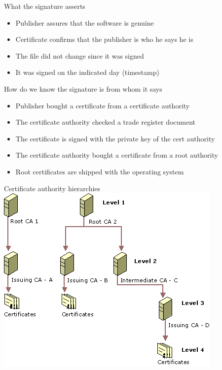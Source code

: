\documentclass[11pt]{beamer}
\begin{document}
\begin{frame}{What the signature asserts}
\begin{itemize}
\item Publisher assures that the software is genuine
\item Certificate confirms that the publisher is who he says he is
\item The file did not change since it was signed
\item It was signed on the indicated day (timestamp)
\end{itemize}
\end{frame}

\begin{frame}{How do we know the signature is from whom it says}
\begin{itemize}
\item Publisher bought a certificate from a certificate authority
\item The certificate authority checked a trade register document
\item The certificate is signed with the private key of the cert authority
\item The certificate authority bought a certificate from a root authority
\item Root certificates are shipped with the operating system
\end{itemize}
\end{frame}

\begin{frame}{Certificate authority hierarchies}
\includegraphics[scale=0.5]{certificate_authority_hierarchies.png}
\end{frame}
\end{document}
